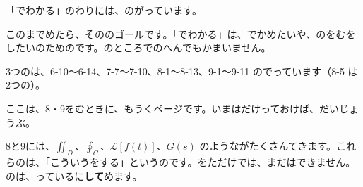 「でわかる」のわりには、のがっています。

\bkkokomade

このまでめたら、そののゴールです。「でわかる」は、でかめたいや、のをむをしたいのためのです。のところでのへんでもかまいません。

3つのは、6-10〜6-14、7-7〜7-10、8-1〜8-13、9-1〜9-11 のでっています（8-5 は2つの）。


ここは、8・9をむときに、もうくページです。いまはだけっておけば、だいじょうぶ。

8と9には、$\textstyle\iint_D$、$\textstyle\oint_C$、$\mathcal{L}[f(t)]$、$G(s)$ のようながたくさんてきます。これらのは、「こういうをする」というの\textbf{}です。をただけでは、まだはできません。のは、っているに\textbf{して}めます。

